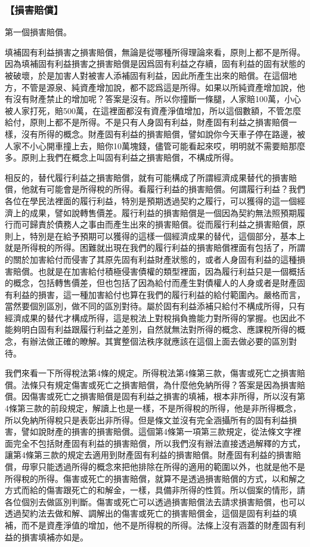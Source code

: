 \documentclass[oneside,sub3section]{ctexbook}
\begin{document}
\hypertarget{ux640dux5bb3ux8ce0ux511f}{%
\subsubsection{【損害賠償】}\label{ux640dux5bb3ux8ce0ux511f}}

第一個損害賠償。

填補固有利益損害之損害賠償，無論是從哪種所得理論來看，原則上都不是所得。因為填補固有利益損害之損害賠償是因爲固有利益之存續，固有利益的固有狀態的被破壞，於是加害人對被害人添補固有利益，因此所產生出來的賠償。在這個地方，不管是源泉、純資產增加說，都不認爲這是所得。如果以所純資產增加說，他有沒有財產禁止的增加呢？答案是沒有。所以你撞斷一條腿，人家賠100萬，小心被人家打死，賠500萬，在這裡面都沒有資產淨值增加，所以這個數額，不管怎麼給付，原則上都不是所得。不是只有人身固有利益，財產固有利益之損害賠償一樣，沒有所得的概念。財產固有利益的損害賠償，譬如說你今天車子停在路邊，被人家不小心開車撞上去，賠你10萬塊錢，儘管可能看起來哎，明明就不需要賠那麼多。原則上我們在概念上叫固有利益之損害賠償，不構成所得。

相反的，替代履行利益之損害賠償，就有可能構成了所謂經濟成果替代的損害賠償，他就有可能會是所得稅的所得。看履行利益的損害賠償。何謂履行利益？我們各位在學民法裡面的履行利益，特別是預期透過契約之履行，可以獲得的這一個經濟上的成果，譬如說轉售價差。履行利益的損害賠償是一個因為契約無法照預期履行而可歸責於債務人之事由而產生出來的損害賠償。從而履行利益之損害賠償，原則上，特別是在給予預期可以獲得的這樣一個經濟成果的替代，這個部分，基本上就是所得稅的所得。困難就出現在我們的履行利益的損害賠償裡面有包括了，所謂的關於加害給付而侵害了其原先固有利益財產狀態的，或者人身固有利益的這種損害賠償。也就是在加害給付積極侵害債權的類型裡面，因為履行利益只是一個概括的概念，包括轉售價差，但也包括了因為給付而產生對債權人的人身或者是財產固有利益的損害，這一種加害給付也算在我們的履行利益的給付範圍內。嚴格而言，當然要個別區別，做不同的區別對待。屬於固有利益添補只給付不構成所得，只有經濟成果的替代才構成所得，這是稅法上對稅捐負擔能力對所得的掌握。也因此不能夠明白固有利益跟履行利益之差別，自然就無法對所得的概念、應課稅所得的概念，有辦法做正確的瞭解。其實整個法秩序就應該在這個上面去做必要的區別對待。

我們來看一下所得稅法第4條的規定。所得稅法第4條第三款，傷害或死亡之損害賠償。法條只有規定傷害或死亡之損害賠償，為什麼他免納所得？答案是因為損害賠償。因傷害或死亡之損害賠償是固有利益之損害的填補，根本非所得，所以沒有第4條第三款的前段規定，解讀上也是一樣，不是所得稅的所得，他是非所得概念，所以免納所得稅只是表彰出非所得。但是條文並沒有完全涵攝所有的固有利益損害，譬如說財產的損害的損害賠償。這個第4條第一項第三款規定，從法條文字裡面完全不包括財產固有利益的損害賠償，所以我們沒有辦法直接透過解釋的方式，讓第4條第三款的規定去適用到財產固有利益的損害賠償。財產固有利益的損害賠償，毋寧只能透過所得的概念來把他排除在所得的適用的範圍以外，也就是他不是所得稅的所得。傷害或死亡的損害賠償，就算不是透過損害賠償的方式，以和解之方式而給的傷害跟死亡的和解金，一樣，具備非所得的性質。所以個案的情形，請各位個別去做區別判斷。傷害或死亡可以透過損害賠償法去請求損害賠償，也可以透過契約法去做和解、調解出的傷害或死亡的損害賠償金，這個是固有利益的填補，而不是資產淨值的增加，他不是所得稅的所得。法條上沒有涵蓋的財產固有利益的損害填補亦如是。
\end{document}
